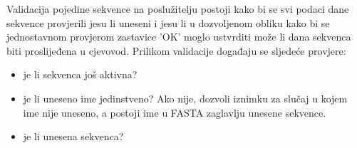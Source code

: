 

Validacija pojedine sekvence na poslužitelju postoji kako bi se svi podaci dane
sekvence provjerili jesu li uneseni i jesu li u dozvoljenom obliku kako bi se
jednostavnom provjerom zastavice 'OK' moglo ustvrditi može li dana sekvenca biti
proslijeđena u cjevovod. Prilikom validacije događaju se sljedeće provjere:

\begin{itemize}

\item je li sekvenca još aktivna?

\item je li uneseno ime jedinstveno? Ako nije, dozvoli iznimku za slučaj u kojem
ime nije uneseno, a postoji ime u FASTA zaglavlju unesene sekvence.

\item je li unesena sekvenca?

\end{itemize}

